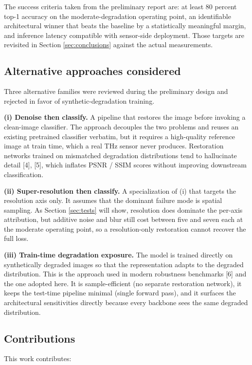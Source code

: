 The success criteria taken from the preliminary report are: at least 80
percent top-1 accuracy on the moderate-degradation operating point, an
identifiable architectural winner that beats the baseline by a statistically
meaningful margin, and inference latency compatible with sensor-side
deployment. Those targets are revisited in Section \ref{sec:conclusions}
against the actual measurements.

\subsection{Alternative approaches considered}
Three alternative families were reviewed during the preliminary design and
rejected in favor of synthetic-degradation training.

\textbf{(i) Denoise then classify.}\quad
A pipeline that restores the image before invoking a clean-image classifier.
The approach decouples the two problems and reuses an existing pretrained
classifier verbatim, but it requires a high-quality reference image at train
time, which a real THz sensor never produces. Restoration networks trained on
mismatched degradation distributions tend to hallucinate detail
[4], [5], which inflates PSNR / SSIM scores without
improving downstream classification.

\textbf{(ii) Super-resolution then classify.}\quad
A specialization of (i) that targets the resolution axis only. It assumes
that the dominant failure mode is spatial sampling. As Section
\ref{sec:tests} will show, resolution does dominate the per-axis attribution,
but additive noise and blur still cost between five and seven \Mpp{} each at
the moderate operating point, so a resolution-only restoration cannot recover
the full loss.

\textbf{(iii) Train-time degradation exposure.}\quad
The model is trained directly on synthetically degraded images so that the
representation adapts to the degraded distribution. This is the approach used
in modern robustness benchmarks [6] and the one
adopted here. It is sample-efficient (no separate restoration network), it
keeps the test-time pipeline minimal (single forward pass), and it surfaces
the architectural sensitivities directly because every backbone sees the
same degraded distribution.

\subsection{Contributions}
This work contributes:

